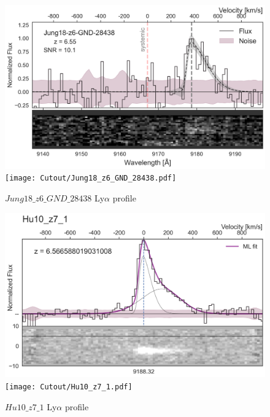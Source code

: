 \documentclass[12pt,english]{article}
\begin{document}
\begin{figure}
\begin{center}\includegraphics[width=12cm, trim=0.1cm 0cm 0cm -1cm]{LyaProfiles/Jung18_z6_GND_28438.png}
\texttt{[image: Cutout/Jung18\_z6\_GND\_28438.pdf]}
\caption{$Jung18\_z6\_GND\_28438$ Ly$\alpha$ profile}
\end{center}
\end{figure}
\clearpage
\begin{figure}
\begin{center}\includegraphics[width=12cm, trim=0.1cm 0cm 0cm -1cm]{LyaProfiles/Hu10_z7_1.png}
\texttt{[image: Cutout/Hu10\_z7\_1.pdf]}
\caption{$Hu10\_z7\_1$ Ly$\alpha$ profile}
\end{center}
\end{figure}
\clearpage
\end{document}
